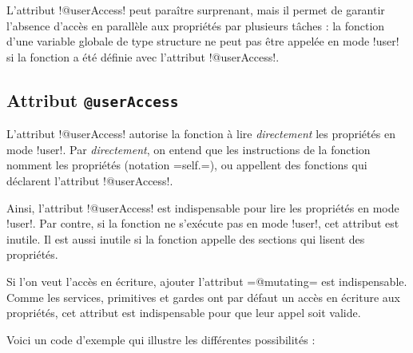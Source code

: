 L'attribut \plm!@userAccess! peut paraître surprenant, mais il permet de garantir l'absence d'accès en parallèle aux propriétés par plusieurs tâches : la fonction d'une variable globale de type structure ne peut pas être appelée en mode \plm!user! si la fonction a été définie avec l'attribut  \plm!@userAccess!.

\subsection{Attribut \texttt{@userAccess}}

L'attribut \plm!@userAccess! autorise la fonction à lire \emph{directement} les propriétés en mode \plm!user!. Par \emph{directement}, on entend que les instructions de la fonction nomment les propriétés (notation \plm=self.=), ou appellent des fonctions qui déclarent l'attribut \plm!@userAccess!.

Ainsi, l'attribut \plm!@userAccess! est indispensable pour lire les propriétés en mode \plm!user!. Par contre, si la fonction ne s'exécute pas en mode \plm!user!, cet attribut est inutile. Il est aussi inutile si la fonction appelle des sections qui lisent des propriétés.

Si l'on veut l'accès en écriture, ajouter l'attribut \plm=@mutating= est indispensable. Comme les services, primitives et gardes ont par défaut un accès en écriture aux propriétés, cet attribut est indispensable pour que leur appel soit valide. 

Voici un code d'exemple qui illustre les différentes possibilités :


